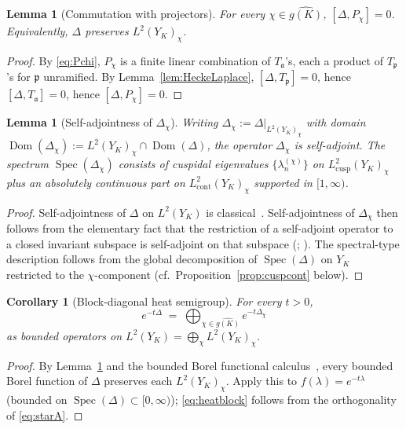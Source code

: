 \documentclass[11pt,a4paper,reqno]{amsart}
\newtheorem{lemma}[theorem]{Lemma}
\newtheorem{corollary}[theorem]{Corollary}
\theoremstyle{definition}
\DeclareMathOperator{\Spec}{Spec}
\DeclareMathOperator{\Dom}{Dom}
\newcommand{\fp}{\mathfrak{p}}
\newcommand{\fa}{\mathfrak{a}}
\newcommand{\YK}{Y_K}
\newcommand{\dualgK}{\widehat{g(K)}}
\newcommand{\Lcusp}{L^2_{\mathrm{cusp}}}
\newcommand{\Lcont}{L^2_{\mathrm{cont}}}
\begin{document}
\begin{lemma}[Commutation with projectors]\label{lem:projcomm}
For every $\chi\in\dualgK$, $[\Delta,P_\chi]=0$. Equivalently, $\Delta$ preserves $L^2(\YK)_\chi$.
\end{lemma}

\begin{proof}
By \eqref{eq:Pchi}, $P_\chi$ is a finite linear combination of $T_\fa$'s, each a product of $T_\fp$'s for $\fp$ unramified. By Lemma~\ref{lem:HeckeLaplace}, $[\Delta,T_\fp]=0$, hence $[\Delta,T_\fa]=0$, hence $[\Delta,P_\chi]=0$.
\end{proof}

\begin{lemma}[Self-adjointness of $\Delta_\chi$]\label{lem:Deltachi}
Writing $\Delta_\chi := \Delta\big|_{L^2(\YK)_\chi}$ with domain $\Dom(\Delta_\chi) := L^2(\YK)_\chi\cap\Dom(\Delta)$, the operator $\Delta_\chi$ is self-adjoint. The spectrum $\Spec(\Delta_\chi)$ consists of cuspidal eigenvalues $\{\lambda_n^{(\chi)}\}$ on $\Lcusp(\YK)_\chi$ plus an absolutely continuous part on $\Lcont(\YK)_\chi$ supported in $[1,\infty)$.
\end{lemma}

\begin{proof}
Self-adjointness of $\Delta$ on $L^2(\YK)$ is classical~\cite[\S4]{ElstrodtGrunewaldMennicke1998}. Self-adjointness of $\Delta_\chi$ then follows from the elementary fact that the restriction of a self-adjoint operator to a closed invariant subspace is self-adjoint on that subspace (\cite[Thm.~VII.2.1]{ReedSimonI}; \cite[\S13.10]{RudinFA}). The spectral-type description follows from the global decomposition of $\Spec(\Delta)$ on $\YK$~\cite[\S\S6.1, 7.4]{ElstrodtGrunewaldMennicke1998} restricted to the $\chi$-component (cf.~Proposition~\ref{prop:cuspcont} below).
\end{proof}

\begin{corollary}[Block-diagonal heat semigroup]\label{cor:heatblock}
For every $t>0$,
\begin{equation}\label{eq:heatblock}
  e^{-t\Delta} \;=\; \bigoplus_{\chi\in\dualgK} e^{-t\Delta_\chi}
\end{equation}
as bounded operators on $L^2(\YK)=\bigoplus_\chi L^2(\YK)_\chi$.
\end{corollary}

\begin{proof}
By Lemma~\ref{lem:projcomm} and the bounded Borel functional calculus~\cite[Thm.~13.24]{RudinFA}, every bounded Borel function of $\Delta$ preserves each $L^2(\YK)_\chi$. Apply this to $f(\lambda)=e^{-t\lambda}$ (bounded on $\Spec(\Delta)\subset[0,\infty)$); \eqref{eq:heatblock} follows from the orthogonality of \eqref{eq:starA}.
\end{proof}
\end{document}
